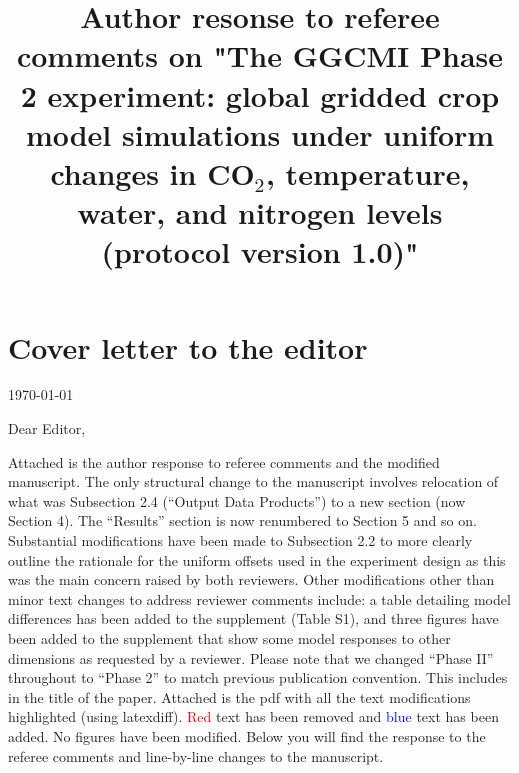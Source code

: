 \documentclass[gmd, manuscript]{copernicus} %
\begin{document}
\title{Author resonse to referee comments on "The GGCMI Phase 2 experiment: global gridded crop model simulations under uniform changes in CO$_2$, temperature, water, and nitrogen levels (protocol version 1.0)"}


\received{}
\pubdiscuss{} %
\revised{}
\accepted{}
\published{}
\maketitle

\section{Cover letter to the editor}

\today
\bigskip

\noindent Dear Editor,

\bigskip
\bigskip

Attached is the author response to referee comments and the modified manuscript.
The only structural change to the manuscript involves relocation of what was Subsection 2.4 (``Output Data Products'') to a new section (now Section 4). The ``Results'' section is now renumbered to Section 5 and so on.
Substantial modifications have been made to Subsection 2.2 to more clearly outline the rationale for the uniform offsets used in the experiment design as this was the main concern raised by both reviewers.
Other modifications other than minor text changes to address reviewer comments include: a table detailing model differences has been added to the supplement (Table S1), and three figures have been added to the supplement that show some model responses to other dimensions as requested by a reviewer. 
Please note that we changed ``Phase II'' throughout to ``Phase 2'' to match previous publication convention. This includes in the title of the paper.
Attached is the pdf with all the text modifications highlighted (using latexdiff). 
\textcolor{red}{Red} text has been removed and \textcolor{blue}{blue} text has been added. 
No figures have been modified.
Below you will find the response to the referee comments and line-by-line changes to the manuscript.
\end{document}
